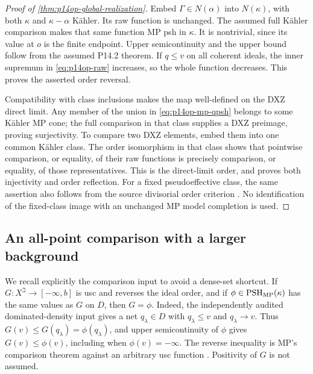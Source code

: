 \begin{proof}[Proof of \cref{thm:p14op-global-realization}]
Embed \(\Gamma\in N(\alpha)\) into \(N(\kappa)\), with both
\(\kappa\) and \(\kappa-\alpha\) K\"ahler. Its raw function
is unchanged. The assumed full K\"ahler comparison makes that same
function MP psh in \(\kappa\). It is nontrivial, since its value at
\(o\) is the finite endpoint. Upper semicontinuity and the upper bound
follow from the assumed P14.2 theorem. If \(q\leq v\) on all coherent
ideals, the inner supremum in \eqref{eq:p14op-raw} increases, so the
whole function decreases. This proves the asserted order reversal.

Compatibility with class inclusions makes the map well-defined on the
DXZ direct limit. Any member of the union in
\eqref{eq:p14op-mp-qpsh} belongs to some K\"ahler MP cone; the full
comparison in that class supplies a DXZ preimage, proving surjectivity.
To compare two DXZ elements, embed them into one common K\"ahler class.
The order isomorphism in that class shows that pointwise comparison, or
equality, of their raw functions is precisely comparison, or equality,
of those representatives. This is the direct-limit order, and proves both
injectivity and order reflection. For a fixed pseudoeffective class,
the same assertion also follows from the source divisorial order criterion
\cite[Lemma~4.2]{Xia23}. No identification of the fixed-class image with
an unchanged MP model completion is used.
\end{proof}

\subsection{An all-point comparison with a larger background}

We recall explicitly the comparison input to avoid a dense-set shortcut.
If \(G:X^\beth\to[-\infty,b]\) is usc and reverses the ideal order,
and if \(\phi\in\operatorname{PSH}_{\mathrm{MP}}(\kappa)\) has the same values
as \(G\) on \(D\), then \(G=\phi\). Indeed, the independently
audited dominated-density input gives a net \(q_\lambda\in D\)
with \(q_\lambda\leq v\) and \(q_\lambda\to v\).
Thus \(G(v)\leq G(q_\lambda)=\phi(q_\lambda)\), and upper
semicontinuity of \(\phi\) gives \(G(v)\leq\phi(v)\), including
when \(\phi(v)=-\infty\). The reverse inequality is MP's comparison
theorem against an arbitrary usc function
\cite[Theorem~4.3.8]{MP24}. Positivity of \(G\) is not assumed.

